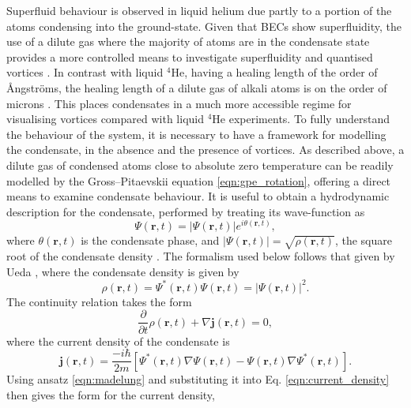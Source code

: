 Superfluid behaviour is observed in liquid helium due partly to a portion of the atoms condensing into the ground-state. Given that BECs show superfluidity, the use of a dilute gas where the majority of atoms are in the condensate state provides a more controlled means to investigate superfluidity and quantised vortices \cite{BK:Ueda_2010,BEC:Srinivasen_pramana_2006,Vtx:Tsubota_arxiv_2010,CT:Tsubota_jpsj_2008}. In contrast with liquid $^4$He, having a healing length of the order of {\r{A}}ngstr{\"o}ms, the healing length of a dilute gas of alkali atoms is on the order of microns \cite{Vtx:Isoshima_pra_1999}. This places condensates in a much more accessible regime for visualising vortices compared with liquid $^4$He experiments. To fully understand the behaviour of the system, it is necessary to have a framework for modelling the condensate, in the absence and the presence of vortices. As described above, a dilute gas of condensed atoms close to absolute zero temperature can be readily modelled by the Gross--Pitaevskii equation \eqref{eqn:gpe_rotation}, offering a direct means to examine condensate behaviour. It is useful to obtain a hydrodynamic description for the condensate, performed by treating its wave-function as
\begin{equation}\label{eqn:madelung}
\Psi(\textbf{r},t) = \vert\Psi(\textbf{r},t)\vert e^{i\theta(\textbf{r},t)},
\end{equation}
where $\theta(\textbf{r},t)$ is the condensate phase, and $\vert\Psi(\textbf{r},t)\vert=\sqrt{\rho(\textbf{r},t)}$, the square root of the condensate density \cite[~chap. 1]{BK:Pitaevskii_Stringari_2003}.
The formalism used below follows that given by Ueda \cite{BK:Ueda_2010}, where the condensate density is given by
\begin{equation}\label{eqn:density}
\rho(\textbf{r},t) = \Psi^*(\textbf{r},t)\Psi(\textbf{r},t) = \vert \Psi (\textbf{r},t) \vert ^2.
\end{equation}
The continuity relation takes the form
\begin{equation}\label{eqn:continuity}
\frac{\partial}{\partial t}\rho(\textbf{r},t)  + \nabla \textbf{j}(\textbf{r},t) = 0,
\end{equation}
where the current density of the condensate is
\begin{equation}\label{eqn:current_density}
\textbf{j}(\textbf{r},t) = \frac{-i\hbar}{2m}\left[\Psi^*(\textbf{r},t)\nabla\Psi(\textbf{r},t) - \Psi(\textbf{r},t)\nabla\Psi^*(\textbf{r},t)\right].
\end{equation}
Using ansatz \eqref{eqn:madelung} and substituting it into Eq. \eqref{eqn:current_density} then gives the form for the current density,

